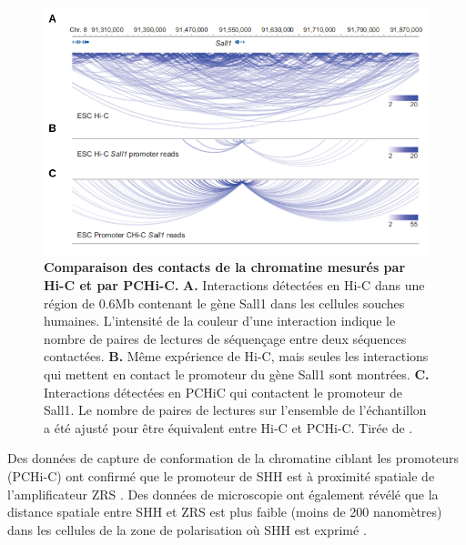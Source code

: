 \begin{figure}[h]
    \centering
    \includegraphics[width=1\textwidth, page=1] {figures/introduction/fig19.png}
    \caption[Comparaison des contacts de la chromatine mesurés par \acrshort{Hi-C} et par \acrshort{PCHi-C}.]{
    \textbf{Comparaison des contacts de la chromatine mesurés par \acrshort{Hi-C} et par \acrshort{PCHi-C}.}
    \textbf{A.} Interactions détectées en \acrshort{Hi-C} dans une région de 0.6Mb contenant le gène Sall1 dans les cellules souches humaines. L'intensité de la couleur d'une interaction indique le nombre de paires de lectures de séquençage entre deux séquences contactées. \textbf{B.} Même expérience de \acrshort{Hi-C}, mais seules les interactions qui mettent en contact le promoteur du gène Sall1 sont montrées. \textbf{C.} Interactions détectées en PCHiC qui contactent le promoteur de Sall1. Le nombre de paires de lectures sur l'ensemble de l'échantillon a été ajusté pour être équivalent entre \acrshort{Hi-C} et \acrshort{PCHi-C}. Tirée de \citep{schoenfelder_pluripotent_2015}.\\
    }
    \label{fig:Fig19}
\end{figure}

Des données de capture de conformation de la chromatine ciblant les promoteurs (\acrshort{PCHi-C}) ont confirmé que le promoteur de \acrshort{SHH} est à proximité spatiale de l’\gls{amplificateur} \acrshort{ZRS} \citep{javierre_lineage-specific_2016, laverre_long-range_2022}. Des données de microscopie ont également révélé que la distance spatiale entre \acrshort{SHH} et \acrshort{ZRS} est plus faible (moins de 200 nanomètres) dans les cellules de la zone de polarisation où \acrshort{SHH} est exprimé \citep{williamson_shh_2016}.

